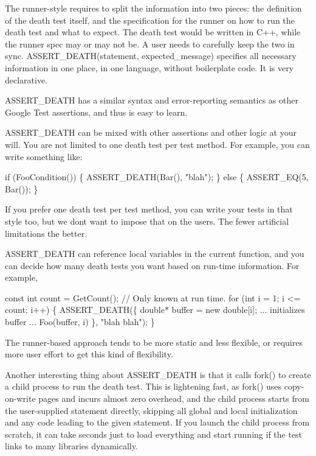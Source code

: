 \begin{DoxyItemize}
\item The runner-\/style requires to split the information into two pieces\+: the definition of the death test itself, and the specification for the runner on how to run the death test and what to expect. The death test would be written in C++, while the runner spec may or may not be. A user needs to carefully keep the two in sync. {\ttfamily A\+S\+S\+E\+R\+T\+\_\+\+D\+E\+A\+T\+H(statement, expected\+\_\+message)} specifies all necessary information in one place, in one language, without boilerplate code. It is very declarative.
\item {\ttfamily A\+S\+S\+E\+R\+T\+\_\+\+D\+E\+A\+TH} has a similar syntax and error-\/reporting semantics as other Google Test assertions, and thus is easy to learn.
\item {\ttfamily A\+S\+S\+E\+R\+T\+\_\+\+D\+E\+A\+TH} can be mixed with other assertions and other logic at your will. You are not limited to one death test per test method. For example, you can write something like\+: 
\begin{DoxyCode}
if (FooCondition()) \{
  ASSERT\_DEATH(Bar(), "blah");
\} else \{
  ASSERT\_EQ(5, Bar());
\}
\end{DoxyCode}
 If you prefer one death test per test method, you can write your tests in that style too, but we don\textquotesingle{}t want to impose that on the users. The fewer artificial limitations the better.
\item {\ttfamily A\+S\+S\+E\+R\+T\+\_\+\+D\+E\+A\+TH} can reference local variables in the current function, and you can decide how many death tests you want based on run-\/time information. For example, 
\begin{DoxyCode}
const int count = GetCount();  // Only known at run time.
for (int i = 1; i <= count; i++) \{
  ASSERT\_DEATH(\{
    double* buffer = new double[i];
    ... initializes buffer ...
    Foo(buffer, i)
  \}, "blah blah");
\}
\end{DoxyCode}
 The runner-\/based approach tends to be more static and less flexible, or requires more user effort to get this kind of flexibility.
\end{DoxyItemize}

Another interesting thing about {\ttfamily A\+S\+S\+E\+R\+T\+\_\+\+D\+E\+A\+TH} is that it calls {\ttfamily fork()} to create a child process to run the death test. This is lightening fast, as {\ttfamily fork()} uses copy-\/on-\/write pages and incurs almost zero overhead, and the child process starts from the user-\/supplied statement directly, skipping all global and local initialization and any code leading to the given statement. If you launch the child process from scratch, it can take seconds just to load everything and start running if the test links to many libraries dynamically.

